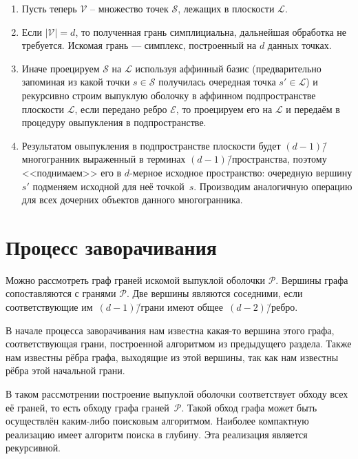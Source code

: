 \documentclass[a4paper,12pt]{article}
\newcommand{\Swarm}{\mathcal{S}}              %
\newcommand{\Polyhedron}{\mathcal{P}}         %
\newcommand{\Edge}{\mathcal{E}}               %
\newcommand{\Viewed}{\mathcal{V}}             %
\newcommand{\Plane}{\mathcal{L}}           %
\renewcommand{\.}{\hspace{0.2ex}}
\begin{document}
    \begin{enumerate}
      \item Пусть теперь $\Viewed$ -- множество точек $\Swarm$, лежащих в плоскости $\Plane$.

      \item Если $|\Viewed| = d$, то полученная грань симплициальна, дальнейшая обработка не требуется. Искомая грань --- симплекс, построенный на $d$ данных точках.

      \item Иначе проецируем $\Swarm$ на $\Plane$ используя аффинный базис (предварительно запоминая из какой точки $s \in \Swarm$ получилась очередная точка $s' \in \Plane$) и рекурсивно строим выпуклую оболочку в аффинном подпространстве плоскости $\Plane$, если передано ребро $\Edge$, то проецируем его на $\Plane$ и передаём в процедуру овыпукления в подпространстве.

      \item Результатом овыпукления в подпространстве плоскости будет $(d-1)$\=/многогранник выраженный в терминах $(d-1)$\=/пространства, поэтому <<поднимаем>> его в $d$-мерное исходное пространство: очередную вершину $s'$ подменяем исходной для неё точкой~$s$. Производим аналогичную операцию для всех дочерних объектов данного многогранника.

    \end{enumerate}



\section{Процесс заворачивания}
  Можно рассмотреть граф граней искомой выпуклой оболочки $\Polyhedron$. Вершины графа сопоставляются с гранями $\Polyhedron$. Две вершины являются соседними, если соответствующие им~$(d-1)$\=/грани имеют общее~$(d-2)$\=/ребро.

  В начале процесса заворачивания нам известна какая-то вершина этого графа, соответствующая грани, построенной алгоритмом из предыдущего раздела. Также нам известны рёбра графа, выходящие из этой вершины, так как нам известны рёбра этой начальной грани.

  В таком рассмотрении построение выпуклой оболочки соответствует обходу всех её граней, то есть обходу графа граней~$\Polyhedron$. Такой обход графа может быть осуществлён каким-либо поисковым алгоритмом. Наиболее компактную реализацию имеет алгоритм поиска в глубину. Эта реализация является рекурсивной.
\end{document}
